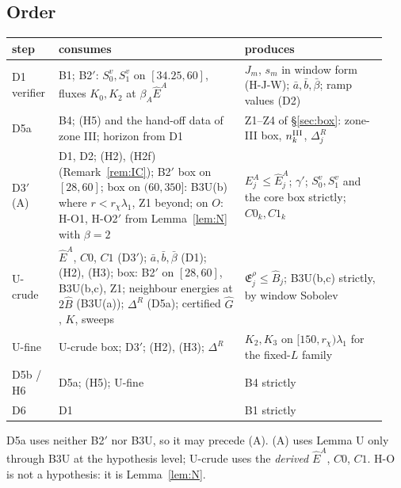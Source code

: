 \documentclass[11pt]{article}
\theoremstyle{definition}\newtheorem{definition}[theorem]{Definition}
\theoremstyle{remark}\newtheorem{remark}[theorem]{Remark}
\newcommand{\E}{\mathfrak E}\newcommand{\B}{\mathfrak B}\newcommand{\Bh}{\hat B}\newcommand{\Eh}{\hat E^A}
\begin{document}
\subsection{Order}
\begin{center}\small\begin{tabular}{@{}p{0.11\linewidth}p{0.47\linewidth}p{0.36\linewidth}@{}}\toprule
step & consumes & produces\\\midrule
D1 verifier & B1; B2$'$: $S_0^v,S_1^v$ on $[34.25,60]$, fluxes $K_0,K_2$ at $\beta_A\Eh$ & $J_m$, $s_m$ in window form (H-J-W); $\bar a,\bar b,\bar\beta$; ramp values (D2)\\
D5a & B4; (H5) and the hand-off data of zone III; horizon from D1 & Z1--Z4 of \S\ref{sec:box}: zone-III box, $n^{\rm III}_k$, $\Delta^R_j$\\
D3$'$ (A) & D1, D2; (H2), (H2f) (Remark~\ref{rem:IC}); B2$'$ box on $[28,60]$; box on $(60,350]$: B3U(b) where $r<r_\chi\lambda_1$, Z1 beyond; on $O$: H-O1, H-O2$'$ from Lemma~\ref{lem:N} with $\beta=2$ & $E^A_j\le\Eh_j$; $\gamma'$; $S_0^v,S_1^v$ and the core box strictly; $C0_k,C1_k$\\
U-crude & $\Eh$, $C0$, $C1$ (D3$'$); $\bar a,\bar b,\bar\beta$ (D1); (H2), (H3); box: B2$'$ on $[28,60]$, B3U(b,c), Z1; neighbour energies at $2\Bh$ (B3U(a)); $\Delta^R$ (D5a); certified $\hat G$, $K$, sweeps & $\E^\rho_j\le\Bh_j$; B3U(b,c) strictly, by window Sobolev\\
U-fine & U-crude box; D3$'$; (H2), (H3); $\Delta^R$ & $K_2,K_3$ on $[150,r_\chi)\lambda_1$ for the fixed-$L$ family\\
D5b / H6 & D5a; (H5); U-fine & B4 strictly\\
D6 & D1 & B1 strictly\\\bottomrule\end{tabular}\end{center}
D5a uses neither B2$'$ nor B3U, so it may precede (A). (A) uses Lemma U only through B3U at the hypothesis level; U-crude uses the \emph{derived} $\Eh$, $C0$, $C1$. H-O is not a hypothesis: it is Lemma~\ref{lem:N}.
\end{document}
